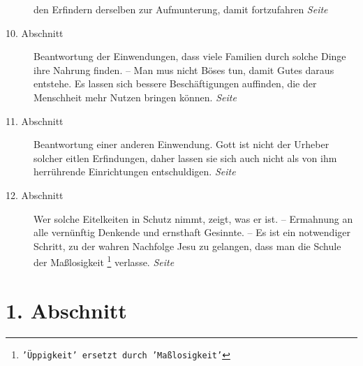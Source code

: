 \begin{description}
den Erfindern derselben zur Aufmunterung, damit fortzufahren
\dotfill \textit{Seite~\pageref{kap17_ab9}}\\
\item[10. Abschnitt] Beantwortung der Einwendungen, dass viele Familien durch
solche Dinge ihre Nahrung finden. -- Man mus nicht Böses tun, damit Gutes
daraus entstehe. Es lassen sich bessere Beschäftigungen auffinden, die der
Menschheit mehr Nutzen bringen können.
\dotfill \textit{Seite~\pageref{kap17_ab10}}\\
\item[11. Abschnitt] Beantwortung einer anderen Einwendung. Gott ist nicht der
Urheber solcher eitlen Erfindungen, daher lassen sie sich auch nicht als von
ihm herrührende Einrichtungen entschuldigen.
\dotfill \textit{Seite~\pageref{kap17_ab11}}\\
\item[12. Abschnitt] Wer solche Eitelkeiten in Schutz nimmt, zeigt, was er ist.
-- Ermahnung an alle vernünftig Denkende und ernsthaft Gesinnte. -- Es ist ein
notwendiger Schritt, zu der wahren Nachfolge Jesu zu gelangen, dass man die
Schule der Maßlosigkeit
\footnote{\texttt{'Üppigkeit' ersetzt durch 'Maßlosigkeit'}}
verlasse.
\dotfill \textit{Seite~\pageref{kap17_ab12}}\\

\end{description}

\newpage

\section{1. Abschnitt} \label{kap17_ab1}


